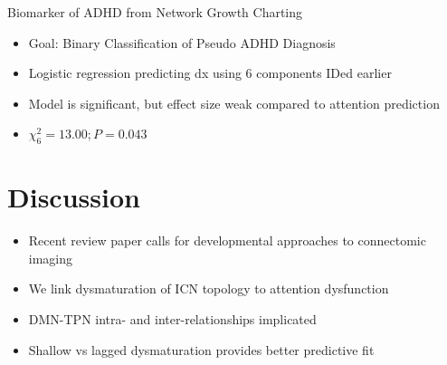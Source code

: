 \documentclass[presentation]{beamer}
\begin{document}
\begin{frame}[label={sec:orgheadline22}]{Biomarker of ADHD from Network Growth Charting}
\begin{itemize}
\item Goal: Binary Classification of Pseudo ADHD Diagnosis
\item Logistic regression predicting dx using 6 components IDed earlier
\item Model is significant, but effect size weak compared to attention prediction
\item \(\chi^2_6 = 13.00; P = 0.043\)
\end{itemize}
\end{frame}
\section{Discussion}
\label{sec:orgheadline24}
\begin{itemize}
\item Recent review paper calls for developmental approaches to connectomic imaging
\item We link dysmaturation of ICN topology to attention dysfunction
\item DMN-TPN intra- and inter-relationships implicated
\item Shallow vs lagged dysmaturation provides better predictive fit
\end{itemize}
\end{document}
